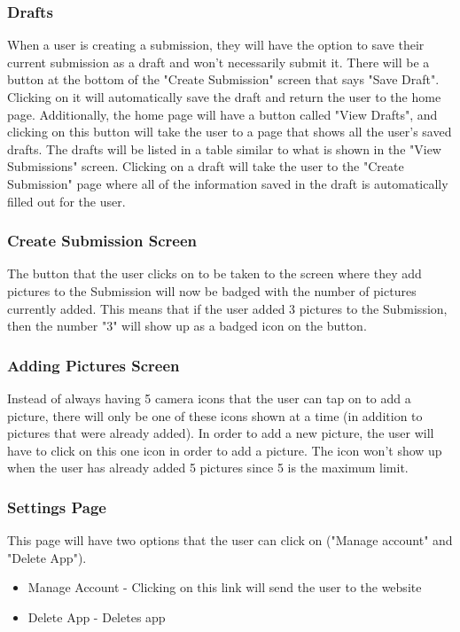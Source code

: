 \documentclass[onecolumn, draftclsnofoot,10pt, compsoc]{IEEEtran}
\begin{document}
\subsubsection{Drafts}
When a user is creating a submission, they will have the option to save their current submission as a draft and won't necessarily submit it. There will be a button at the bottom of the "Create Submission" screen that says "Save Draft". Clicking on it will automatically save the draft and return the user to the home page. Additionally, the home page will have a button called "View Drafts", and clicking on this button will take the user to a page that shows all the user's saved drafts. The drafts will be listed in a table similar to what is shown in the "View Submissions" screen. Clicking on a draft will take the user to the "Create Submission" page where all of the information saved in the draft is automatically filled out for the user.

\subsubsection{Create Submission Screen}
The button that the user clicks on to be taken to the screen where they add pictures to the Submission will now be badged with the number of pictures currently added. This means that if the user added 3 pictures to the Submission, then the number "3" will show up as a badged icon on the button.

\subsubsection{Adding Pictures Screen}
Instead of always having 5 camera icons that the user can tap on to add a picture, there  will only be one of these icons shown at a time (in addition to pictures that were already added). In order to add a new picture, the user will have to click on this one icon in order to add a picture. The icon won't show up when the user has already added 5 pictures since 5 is the maximum limit.

\subsubsection{Settings Page}
This page will have two options that the user can click on ("Manage account" and "Delete App").
\begin{itemize}
\item Manage Account - Clicking on this link will send the user to the website
\item Delete App - Deletes app 
\end{itemize}
\end{document}
